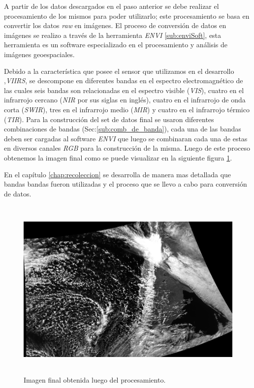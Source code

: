A partir de los datos descargados en el paso anterior se debe realizar el procesamiento de los mismos para poder utilizarlo; este procesamiento se basa en convertir los datos \textit{raw} en imágenes. El proceso de conversión de datos en imágenes se realizo a través de la herramienta \textit{ENVI} \ref{sub:enviSoft}, esta herramienta es un software  especializado en el procesamiento y análisis de imágenes  geoespaciales.

Debido a la característica que posee el sensor que utilizamos en el desarrollo ,\textit{VIIRS}, se descompone en diferentes bandas en el espectro electromagnético de las cuales seis bandas son relacionadas en el espectro visible (\textit{VIS}), cuatro en el infrarrojo cercano (\textit{NIR} por sus siglas en inglés), cuatro en el infrarrojo de onda corta (\textit{SWIR}), tres en el infrarrojo medio (\textit{MIR}) y cuatro en el infrarrojo térmico (\textit{TIR}). Para la construcción del set de datos final se usaron diferentes combinaciones de bandas (Sec:\ref{sub:comb_de_banda}), cada una de las bandas deben ser cargadas al software \textit{ENVI} que luego se combinaran cada una de estas en diversos canales \textit{RGB} para la construcción de la misma. Luego de este proceso obtenemos la imagen final como se puede visualizar en la siguiente figura \ref{Fig:img-final}.

En el capítulo \ref{chap:recoleccion} se desarrolla de manera mas detallada que bandas bandas fueron utilizadas y el proceso que se llevo a cabo para conversión de datos.

\begin{figure}[H] \centering
  \includegraphics[height=9cm,keepaspectratio=true,clip=true]{imagenes/tbd/pre-img.png}
  \caption{Imagen final obtenida luego del procesamiento.}\label{Fig:img-final}
\end{figure}



